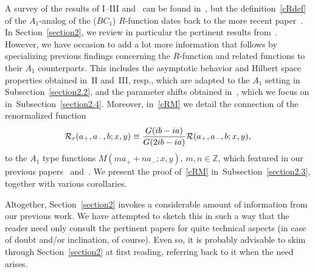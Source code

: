 \documentclass[11pt]{article}
\numberwithin{equation}{section}
\newcommand{\Z}{{\mathbb Z}}
\newcommand{\cR}{{\cal R}}
\newcommand{\aaa}{a_{+},a_{-}}
\begin{document}
A survey of the results of I--III and~\cite{anne} can be found in~\cite{Rsurv}, but the def\/inition~\eqref{cRdef} of the $A_1$-analog of the ($BC_1$) $R$-function dates back to the more recent paper~\cite{quad}. In Section~\ref{section2}, we review in particular the pertinent results from~\cite{quad}. However, we have occasion to  add a lot more information that follows by specializing previous f\/indings concerning the $R$-function and related functions to their $A_1$ counterparts. This includes the asymptotic behavior and Hilbert space properties obtained in~II and~III, resp., which are adapted to the $A_1$ setting in Subsection~\ref{section2.2}, and the parameter shifts obtained in~\cite{anne}, which we focus on in~Subsection~\ref{section2.4}.  Moreover, in~\eqref{cRM} we detail the connection of the renormalized function
\begin{gather}\label{cRr}
\cR_r(\aaa,b;x,y)\equiv  \frac{G(ib-ia)}{G(2ib-ia)}\cR(\aaa,b;x,y),
\end{gather}
to the $A_1$ type functions $M(ma_{+}+na_{-};x,y)$, $m,n\in\Z$, which featured in our previous papers~\cite{GLFII} and~\cite{Hilb}. We present the proof of~\eqref{cRM} in~Subsection~\ref{section2.3}, together with various corollaries.

Altogether, Section~\ref{section2} invokes a considerable amount of information from our previous work. We have attempted to sketch this in such a way that the reader need only consult the pertinent papers for quite technical aspects (in case of doubt and/or inclination, of course). Even so, it is probably advisable to skim through Section~\ref{section2} at f\/irst reading, referring back to it when the need arises.
\end{document}
